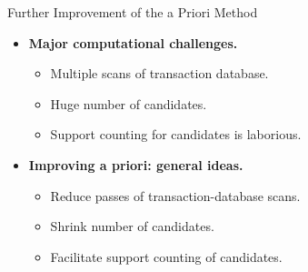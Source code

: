 \begin{frame}{Further Improvement of the a Priori Method}
	\begin{itemize}
		\item \textbf{Major computational challenges.}
		\begin{itemize}
			\item Multiple scans of transaction database.
			\item Huge number of candidates.
			\item Support counting for candidates is laborious.
		\end{itemize}
		\item \textbf{Improving a priori: general ideas.}
		\begin{itemize}
			\item Reduce passes of transaction-database scans.
			\item Shrink number of candidates.
			\item Facilitate support counting of candidates.
		\end{itemize}
	\end{itemize}
\end{frame}


